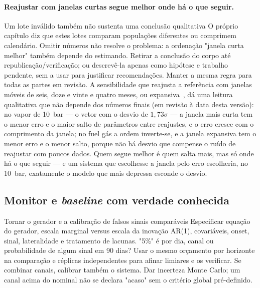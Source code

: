 \paragraph{Reajustar com janelas curtas segue melhor onde há o que seguir.}
{Um lote inválido também não sustenta uma conclusão qualitativa}
{O próprio capítulo diz que estes lotes comparam populações diferentes
ou comprimem calendário. Omitir números não resolve o problema:
a ordenação "janela curta melhor" também depende do estimando.
Retirar a conclusão do corpo até republicação/verificação; ou descrevê-la
apenas como hipótese e trabalho pendente, sem a usar para justificar
recomendações. Manter a mesma regra para todas as partes em revisão.}%
A sensibilidade que reajusta a referência com janelas móveis de seis, doze e
vinte e quatro meses, ou expansiva~\cite{PesaranTimmermann2007}, dá uma
leitura qualitativa que não
depende dos números finais (em revisão à data desta versão): no vapor de
10~bar --- o vetor com o desvio de $1{,}73\sigma$ --- a janela mais curta
tem o menor erro e o maior salto de parâmetros entre reajustes, e o erro
cresce com o comprimento da janela; no fuel gás a ordem inverte-se, e a
janela expansiva tem o menor erro e o menor salto, porque não há desvio que
compense o ruído de reajustar com poucos dados. Quem segue melhor é quem
salta mais, mas só onde há o que seguir --- e um sistema que escolhesse a
janela pelo erro escolheria, no 10~bar, exatamente o modelo que mais depressa
esconde o desvio.

\subsection{Monitor e \emph{baseline} com verdade conhecida}
\label{sec:verdade-conhecida}
{Tornar o gerador e a calibração de falsos sinais comparáveis}
{Especificar equação do gerador, escala marginal versus escala da
inovação AR(1), covariáveis, onset, sinal, lateralidade e tratamento de
lacunas. "5\%" é por dia, canal ou probabilidade de algum sinal em 90 dias?
Usar o mesmo orçamento por horizonte na comparação e réplicas
independentes para afinar limiares e os verificar. Se combinar canais,
calibrar também o sistema. Dar incerteza Monte Carlo; um canal acima
do nominal não se declara "acaso" sem o critério global pré-definido.}%

